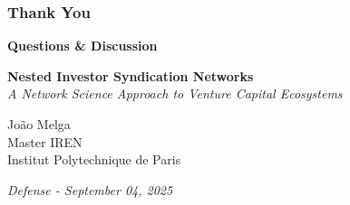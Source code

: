 \begin{frame}
\frametitle{Thank You}

\begin{center}
\vspace{1cm}
{\Large \textbf{Questions \& Discussion}}

\vspace{1cm}

\textbf{Nested Investor Syndication Networks}\\
\textit{A Network Science Approach to Venture Capital Ecosystems}

\vspace{1cm}

João Melga\\
Master IREN\\
Institut Polytechnique de Paris

\vspace{1cm}

\textit{Defense - September 04, 2025}
\end{center}

\end{frame}
